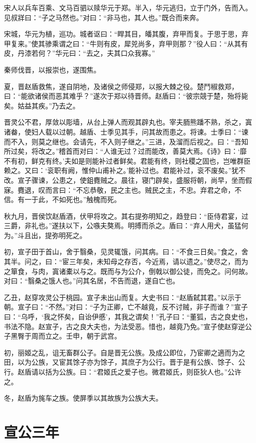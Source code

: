 \documentclass[a4paper,12pt,UTF8,twoside]{ctexbook}
\begin{document}
宋人以兵车百乘、文马百驷以赎华元于郑。半入，华元逃归，立于门外，告而入。见叔牂曰：“子之马然也。”对曰：“非马也，其人也。”既合而来奔。

宋城，华元为植，巡功。城者讴曰：“睅其目，皤其腹，弃甲而复。于思于思，弃甲复来。”使其骖乘谓之曰：“牛则有皮，犀兕尚多，弃甲则那？”役人曰：“从其有皮，丹漆若何？”华元曰：“去之，夫其口众我寡。”

秦师伐晋，以报崇也，遂围焦。

夏，晋赵盾救焦，遂自阴地，及诸侯之师侵郑，以报大棘之役。楚鬥椒救郑，曰：“能欲诸侯而恶其难乎？”遂次于郑以待晋师。赵盾曰：“彼宗競于楚，殆将毙矣。姑益其疾。”乃去之。

晋灵公不君，厚敛以彫墙，从台上弹人而观其辟丸也。宰夫胹熊蹯不熟，杀之，寘诸畚，使妇人载以过朝。越盾、士季见其手，问其故而患之。将谏。士季曰：“谏而不入，则莫之继也。会请先，不入则子继之。”三进，及溜而后视之。曰：“吾知所过矣，将改之。”稽首而对曰：“人谁无过？过而能改，善莫大焉。《诗》曰：‘靡不有初，鲜克有终。’夫如是则能补过者鲜矣。君能有终，则社稷之固也，岂唯群臣赖之。又曰：‘衮职有阙，惟仲山甫补之。’能补过也。君能补过，衮不废矣。”犹不改。宣子骤谏，公患之，使鉏麑贼之。晨往，寝门辟矣，盛服将朝，尚早，坐而假寐。麑退，叹而言曰：“不忘恭敬，民之主也。贼民之主，不忠。弃君之命，不信。有一于此，不如死也。”触槐而死。

秋九月，晋侯饮赵盾酒，伏甲将攻之。其右提弥明知之，趋登曰：“臣侍君宴，过三爵，非礼也。”遂扶以下，公嗾夫獒焉。明搏而杀之。盾曰：“弃人用犬，虽猛何为。”斗且出，提弥明死之。

初，宣子田于首山，舍于翳桑，见灵辄饿，问其病。曰：“不食三日矣。”食之，舍其半。问之，曰：“宦三年矣，未知母之存否，今近焉，请以遗之。”使尽之，而为之箪食，与肉，寘诸橐以与之。既而与为公介，倒戟以御公徒，而免之。问何故。对曰：“翳桑之饿人也。”问其名居，不告而退，遂自亡也。

乙丑，赵穿攻灵公于桃园。宣子未出山而复。大史书曰：“赵盾弑其君。”以示于朝。宣子曰：“不然。”对曰：“子为正卿，亡不越竟，反不讨贼，非子而谁？”宣子曰：“乌呼，‘我之怀矣，自诒伊慼’，其我之谓矣！”孔子曰：“董狐，古之良史也，书法不隐。赵宣子，古之良大夫也，为法受恶。惜也，越竟乃免。”宣子使赵穿逆公子黑臀于周而立之。壬申，朝于武宫。

初，丽姬之乱，诅无畜群公子。自是晋无公族。及成公即位，乃宦卿之適而为之田，以为公族，又宦其馀子亦为馀子，其庶子为公行。晋于是有公族、馀子、公行。赵盾请以括为公族。曰：“君姬氏之爱子也。微君姬氏，则臣狄人也。”公许之。

冬，赵盾为旄车之族。使屏季以其故族为公族大夫。


\chapter{宣公三年}
\end{document}
